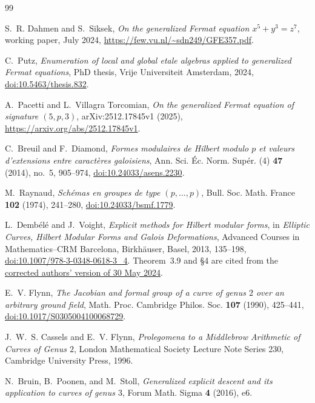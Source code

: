 \documentclass[11pt]{article}
\theoremstyle{definition}
\theoremstyle{remark}
\begin{document}
\small
\begin{thebibliography}{99}

S.~R. Dahmen and S.~Siksek,
\emph{On the generalized Fermat equation $x^5+y^3=z^7$},
working paper, July 2024,
\url{https://few.vu.nl/~sdn249/GFE357.pdf}.

C.~Putz,
\emph{Enumeration of local and global etale algebras applied to generalized
Fermat equations}, PhD thesis, Vrije Universiteit Amsterdam, 2024,
\href{https://doi.org/10.5463/thesis.832}{doi:10.5463/thesis.832}.

A.~Pacetti and L.~Villagra Torcomian,
\emph{On the generalized Fermat equation of signature $(5,p,3)$},
arXiv:2512.17845v1 (2025),
\url{https://arxiv.org/abs/2512.17845v1}.

C.~Breuil and F.~Diamond,
\emph{Formes modulaires de Hilbert modulo $p$ et valeurs d'extensions entre
caract\`eres galoisiens},
Ann. Sci. \'{E}c. Norm. Sup\'{e}r. (4) \textbf{47} (2014), no.~5, 905--974,
\href{https://doi.org/10.24033/asens.2230}{doi:10.24033/asens.2230}.

M.~Raynaud,
\emph{Sch\'emas en groupes de type $(p,\ldots,p)$},
Bull. Soc. Math. France \textbf{102} (1974), 241--280,
\href{https://doi.org/10.24033/bsmf.1779}{doi:10.24033/bsmf.1779}.

L.~Demb\'el\'e and J.~Voight,
\emph{Explicit methods for Hilbert modular forms},
in \emph{Elliptic Curves, Hilbert Modular Forms and Galois Deformations},
Advanced Courses in Mathematics--CRM Barcelona,
Birkh\"auser, Basel, 2013, 135--198,
\href{https://doi.org/10.1007/978-3-0348-0618-3_4}
{doi:10.1007/978-3-0348-0618-3\_4}.
Theorem~3.9 and \S4 are cited from the
\href{https://jvoight.github.io/articles/hmf-crm-bcn-053024.pdf}
{corrected authors' version of 30 May 2024}.

E.~V. Flynn,
\emph{The Jacobian and formal group of a curve of genus $2$ over an
arbitrary ground field},
Math. Proc. Cambridge Philos. Soc. \textbf{107} (1990), 425--441,
\href{https://doi.org/10.1017/S0305004100068729}
     {doi:10.1017/S0305004100068729}.

J.~W.~S. Cassels and E.~V. Flynn,
\emph{Prolegomena to a Middlebrow Arithmetic of Curves of Genus $2$},
London Mathematical Society Lecture Note Series 230,
Cambridge University Press, 1996.

N.~Bruin, B.~Poonen, and M.~Stoll,
\emph{Generalized explicit descent and its application to curves of genus
$3$}, Forum Math. Sigma \textbf{4} (2016), e6.


\end{thebibliography}
\end{document}
